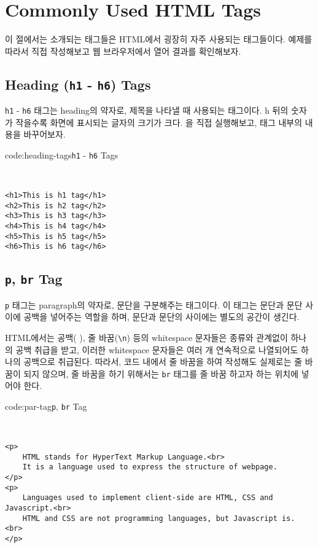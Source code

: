 \section{Commonly Used HTML Tags} \label{sect:commonly-used-html-tags}

이 절에서는 소개되는 태그들은 HTML에서 굉장히 자주 사용되는 태그들이다. 예제를 따라서 직접 작성해보고 웹 브라우저에서 열어 결과를 확인해보자.

\subsection*{Heading (\texttt{h1} - \texttt{h6}) Tags}
\verb|h1| - \verb|h6| 태그는 heading의 약자로, 제목을 나타낼 때 사용되는 태그이다. h 뒤의 숫자가 작을수록 화면에 표시되는 글자의 크기가 크다. 을 직접 실행해보고, 태그 내부의 내용을 바꾸어보자.

\begin{codeenv}{code:heading-tags}{\texttt{h1} - \texttt{h6} Tags}\begin{verbatim}


<h1>This is h1 tag</h1>
<h2>This is h2 tag</h2>
<h3>This is h3 tag</h3>
<h4>This is h4 tag</h4>
<h5>This is h5 tag</h5>
<h6>This is h6 tag</h6>
\end{verbatim}
\end{codeenv}

\subsection*{\texttt{p}, \texttt{br} Tag}
\verb|p| 태그는 paragraph의 약자로, 문단을 구분해주는 태그이다. 이 태그는 문단과 문단 사이에 공백을 넣어주는 역할을 하며, 문단과 문단의 사이에는 별도의 공간이 생긴다. 

HTML에서는 공백( ), 줄 바꿈(\verb|\n|) 등의 whitespace 문자들은 종류와 관계없이 하나의 공백 취급을 받고, 이러한 whitespace 문자들은 여러 개 연속적으로 나열되어도 하나의 공백으로 취급된다. 따라서, 코드 내에서 줄 바꿈을 하여 작성해도 실제로는 줄 바꿈이 되지 않으며, 줄 바꿈을 하기 위해서는 \verb|br| 태그를 줄 바꿈 하고자 하는 위치에 넣어야 한다. 

\begin{codeenv}{code:par-tag}{\texttt{p}, \texttt{br} Tag}\begin{verbatim}


<p>
    HTML stands for HyperText Markup Language.<br>
    It is a language used to express the structure of webpage.
</p>
<p>
    Languages used to implement client-side are HTML, CSS and Javascript.<br>
    HTML and CSS are not programming languages, but Javascript is. <br>
</p>
\end{verbatim}
\end{codeenv}

